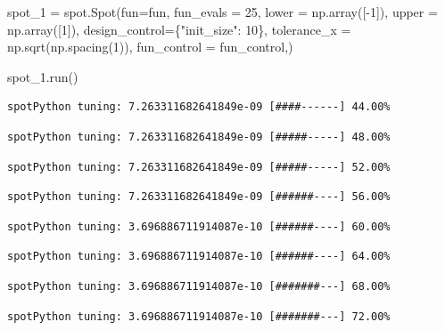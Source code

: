 \documentclass[
  letterpaper,
  DIV=11,
  numbers=noendperiod]{scrreprt}
\newenvironment{Shaded}{\begin{snugshade}}{\end{snugshade}}
\newcommand{\DecValTok}[1]{\textcolor[rgb]{0.68,0.00,0.00}{#1}}
\newcommand{\NormalTok}[1]{\textcolor[rgb]{0.00,0.23,0.31}{#1}}
\newcommand{\OperatorTok}[1]{\textcolor[rgb]{0.37,0.37,0.37}{#1}}
\newcommand{\StringTok}[1]{\textcolor[rgb]{0.13,0.47,0.30}{#1}}
\begin{document}
\begin{Shaded}
\begin{Highlighting}[]
\NormalTok{spot\_1 }\OperatorTok{=}\NormalTok{ spot.Spot(fun}\OperatorTok{=}\NormalTok{fun,}
\NormalTok{                   fun\_evals }\OperatorTok{=} \DecValTok{25}\NormalTok{,}
\NormalTok{                   lower }\OperatorTok{=}\NormalTok{ np.array([}\OperatorTok{{-}}\DecValTok{1}\NormalTok{]),}
\NormalTok{                   upper }\OperatorTok{=}\NormalTok{ np.array([}\DecValTok{1}\NormalTok{]),}
\NormalTok{                   design\_control}\OperatorTok{=}\NormalTok{\{}\StringTok{"init\_size"}\NormalTok{: }\DecValTok{10}\NormalTok{\},}
\NormalTok{                   tolerance\_x }\OperatorTok{=}\NormalTok{ np.sqrt(np.spacing(}\DecValTok{1}\NormalTok{)),}
\NormalTok{                   fun\_control }\OperatorTok{=}\NormalTok{ fun\_control,)}

\NormalTok{spot\_1.run()}
\end{Highlighting}
\end{Shaded}

\begin{verbatim}
spotPython tuning: 7.263311682641849e-09 [####------] 44.00% 
\end{verbatim}

\begin{verbatim}
spotPython tuning: 7.263311682641849e-09 [#####-----] 48.00% 
\end{verbatim}

\begin{verbatim}
spotPython tuning: 7.263311682641849e-09 [#####-----] 52.00% 
\end{verbatim}

\begin{verbatim}
spotPython tuning: 7.263311682641849e-09 [######----] 56.00% 
\end{verbatim}

\begin{verbatim}
spotPython tuning: 3.696886711914087e-10 [######----] 60.00% 
\end{verbatim}

\begin{verbatim}
spotPython tuning: 3.696886711914087e-10 [######----] 64.00% 
\end{verbatim}

\begin{verbatim}
spotPython tuning: 3.696886711914087e-10 [#######---] 68.00% 
\end{verbatim}

\begin{verbatim}
spotPython tuning: 3.696886711914087e-10 [#######---] 72.00% 
\end{verbatim}
\end{document}
